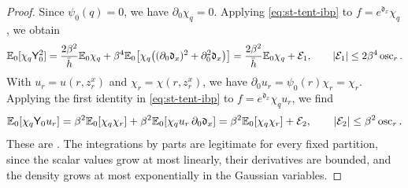 \begin{proof}
Since $\psi_0(q)=0$, we have $\partial_0\chi_q=0$. Applying \eqref{eq:st-tent-ibp} to $f=e^{\mathfrak d_x}\chi_q$, we obtain
\begin{equation}\label{eq:st-Y0-square}
 \mathbb E_0[\chi_q\mathsf Y_0^2]=\frac{2\beta^2}{\bar h}\mathbb E_0\chi_q+\beta^4\mathbb E_0\bigl[\chi_q\bigl((\partial_0\mathfrak d_x)^2+\partial_0^2\mathfrak d_x\bigr)\bigr]
 =\frac{2\beta^2}{\bar h}\mathbb E_0\chi_q+\mathcal E_1,\qquad\lvert \mathcal E_1\rvert\le2\beta^4\operatorname{osc}_r.
\end{equation}
With $u_r=u(r,z^x_r)$ and $\chi_r=\chi(r,z^x_r)$, we have $\partial_0u_r=\psi_0(r)\chi_r=\chi_r$. Applying the first identity in \eqref{eq:st-tent-ibp} to $f=e^{\mathfrak d_x}\chi_qu_r$, we find
\begin{equation}\label{eq:st-Y0-linear}
 \mathbb E_0[\chi_q\mathsf Y_0u_r]=\beta^2\mathbb E_0[\chi_q\chi_r]+\beta^2\mathbb E_0[\chi_qu_r\,\partial_0\mathfrak d_x]
 =\beta^2\mathbb E_0[\chi_q\chi_r]+\mathcal E_2,\qquad\lvert \mathcal E_2\rvert\le\beta^2\operatorname{osc}_r.
\end{equation}
These are \cite[(7.24)--(7.25)]{oai-barriers}. The integrations by parts are legitimate for every fixed partition, since the scalar values grow at most linearly, their derivatives are bounded, and the density grows at most exponentially in the Gaussian variables.


\end{proof}
